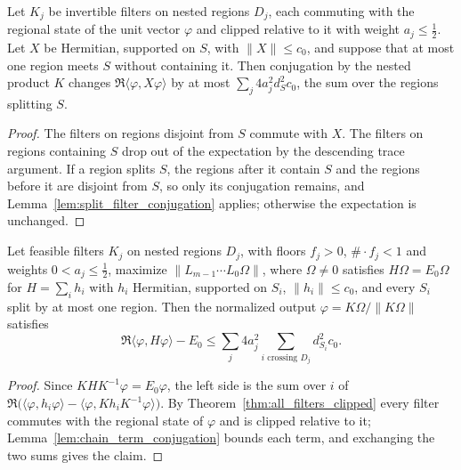 \begin{lemma}
    \label{lem:chain_term_conjugation}
    \leanok
    Let $K_j$ be invertible filters on nested regions $D_j$, each commuting with the regional
    state of the unit vector $\varphi$ and clipped relative to it with weight $a_j\le\tfrac12$.
    Let $X$ be Hermitian, supported on $S$, with $\lVert X\rVert\le c_0$, and suppose that at
    most one region meets $S$ without containing it. Then conjugation by the nested product
    $K$ changes $\Re\langle\varphi,X\varphi\rangle$ by at most
    $\sum_{j}4a_j^2d_S^2c_0$, the sum over the regions splitting $S$.
\end{lemma}
\begin{proof}\leanok
    The filters on regions disjoint from $S$ commute with $X$. The filters on regions
    containing $S$ drop out of the expectation by the descending trace argument. If a region
    splits $S$, the regions after it contain $S$ and the regions before it are disjoint from
    $S$, so only its conjugation remains, and Lemma~\ref{lem:split_filter_conjugation}
    applies; otherwise the expectation is unchanged.
\end{proof}

\begin{theorem}
    \label{thm:chain_energy}
    \leanok
    Let feasible filters $K_j$ on nested regions $D_j$, with floors $f_j>0$,
    $\#\cdot f_j<1$ and weights $0<a_j\le\tfrac12$, maximize
    $\lVert L_{m-1}\cdots L_0\Omega\rVert$, where $\Omega\ne0$ satisfies $H\Omega=E_0\Omega$
    for $H=\sum_ih_i$ with $h_i$ Hermitian, supported on $S_i$, $\lVert h_i\rVert\le c_0$, and
    every $S_i$ split by at most one region. Then the normalized output
    $\varphi=K\Omega/\lVert K\Omega\rVert$ satisfies
    \[
        \Re\langle\varphi,H\varphi\rangle-E_0
        \le\sum_j4a_j^2\sum_{i\text{ crossing }D_j}d_{S_i}^2c_0 .
    \]
\end{theorem}
\begin{proof}\leanok
    Since $KHK^{-1}\varphi=E_0\varphi$, the left side is the sum over $i$ of
    $\Re\bigl(\langle\varphi,h_i\varphi\rangle-\langle\varphi,Kh_iK^{-1}\varphi\rangle\bigr)$.
    By Theorem~\ref{thm:all_filters_clipped} every filter commutes with the regional state of
    $\varphi$ and is clipped relative to it; Lemma~\ref{lem:chain_term_conjugation} bounds each
    term, and exchanging the two sums gives the claim.
\end{proof}

